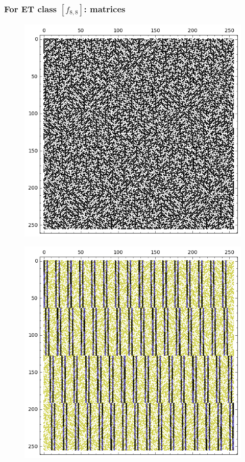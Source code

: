 \documentclass[pdf,sprung,slideColor,nocolorBG]{beamer}
\begin{document}
\begin{frame}
\frametitle{For ET class $[f_{8,8}]$: matrices}
\begin{figure}
\centering
\begin{minipage}{.48\textwidth}
  \centering
  \includegraphics[width=.9\linewidth]{../matrix_plot/c8_8_weight_class_matrix.png}
  \label{fig:8_8_weight_class_matrix}
\end{minipage}%
\begin{minipage}{.48\textwidth}
  \centering
  \includegraphics[width=.9\linewidth]{../matrix_plot/c8_8_bent_cayley_graph_index_matrix.png}
  \label{fig:8_8_bent_cayley_graph_index_matrix}
\end{minipage}
\end{figure}
~
\end{frame}
\end{document}
